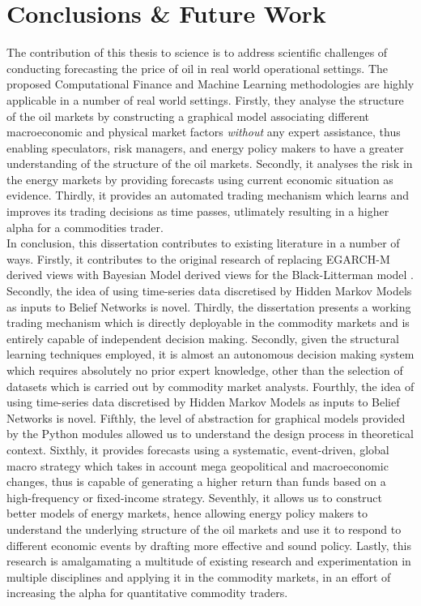\chapter{Conclusions \& Future Work}

The contribution of this thesis to science is to address scientific challenges of conducting forecasting the price of oil in real world operational settings. The proposed Computational Finance and Machine Learning methodologies are highly applicable in a number of real world settings. Firstly, they analyse the structure of the oil markets by constructing a graphical model associating different macroeconomic and physical market factors \textit{without} any expert assistance, thus enabling speculators, risk managers, and energy policy makers to have a greater understanding of the structure of the oil markets. Secondly, it analyses the risk in the energy markets by providing forecasts using current economic situation as evidence. Thirdly, it provides an automated trading mechanism which learns and improves its trading decisions as time passes, utlimately resulting in a higher alpha for a commodities trader. \\

In conclusion, this dissertation contributes to existing literature in a number of ways. Firstly, it contributes to the original research of replacing EGARCH-M derived views with Bayesian Model derived views for the Black-Litterman model \cite{Beach2007}. Secondly, the idea of using time-series data discretised by Hidden Markov Models as inputs to Belief Networks is novel. Thirdly, the dissertation presents a working trading mechanism which is directly deployable in the commodity markets and is entirely capable of independent decision making. Secondly, given the structural learning techniques employed, it is almost an autonomous decision making system which requires absolutely no prior expert knowledge, other than the selection of datasets which is carried out by commodity market analysts. Fourthly, the idea of using time-series data discretised by Hidden Markov Models as inputs to Belief Networks is novel. Fifthly, the level of abstraction for graphical models provided by the Python modules allowed us to understand the design process in theoretical context.  Sixthly, it provides forecasts using a systematic, event-driven,  global macro strategy which takes in account mega geopolitical and macroeconomic changes, thus is capable of generating a higher return than funds based on a high-frequency or fixed-income strategy. Seventhly, it allows us to construct better models of energy markets, hence allowing energy policy makers to understand the underlying structure of the oil markets and use it to respond to different economic events by drafting more effective and sound policy. Lastly, this research is amalgamating a multitude of existing research and experimentation in multiple disciplines and applying it in the commodity markets, in an effort of increasing the alpha for quantitative commodity traders. \\


